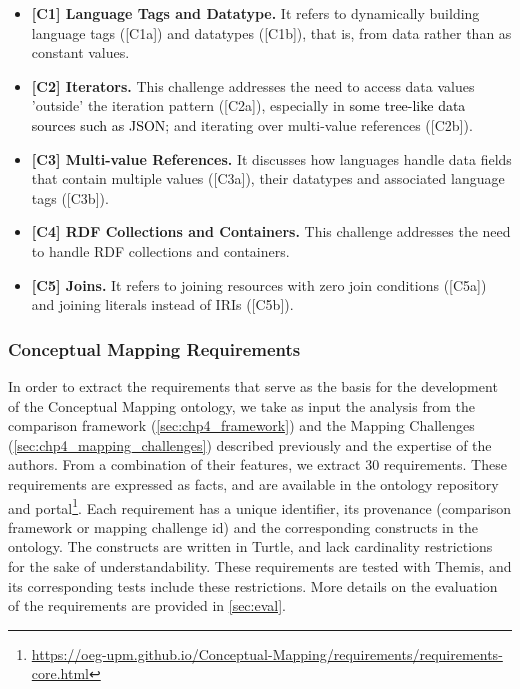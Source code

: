 \begin{itemize}
    \item \textbf{[C1] Language Tags and Datatype.} It refers to dynamically building language tags ([C1a]) and datatypes ([C1b]), that is, from data rather than as constant values.
    \item \textbf{[C2] Iterators.} This challenge addresses the need to access data values 'outside' the iteration pattern ([C2a]), especially in \textcolor{black}{some tree-like data sources such as JSON}; and iterating over multi-value references ([C2b]).
    \item \textbf{[C3] Multi-value References.} It discusses how languages  handle data fields that contain multiple values ([C3a]), their datatypes and associated language tags ([C3b]).
    \item \textbf{[C4] RDF Collections and Containers.} This challenge addresses the need to handle RDF collections and containers.
    \item \textbf{[C5] Joins.} It refers to joining resources with zero join conditions ([C5a]) and joining literals instead of IRIs ([C5b]).
\end{itemize} 


\subsubsection{Conceptual Mapping Requirements}

In order to extract the requirements that serve as the basis for the development of the Conceptual Mapping ontology, we take as input the analysis from the comparison framework (\cref{sec:chp4_framework}) and the Mapping Challenges (\cref{sec:chp4_mapping_challenges}) described previously and the expertise of the authors. From a combination of their features, we extract 30 requirements. These requirements are expressed as facts, and are available in the ontology repository and portal\footnote{\url{https://oeg-upm.github.io/Conceptual-Mapping/requirements/requirements-core.html}}. Each requirement has a unique identifier, its provenance (comparison framework or mapping challenge id) and the corresponding constructs in the ontology. The constructs are written in Turtle, and lack cardinality restrictions for the sake of understandability. These requirements are tested with Themis, and its corresponding tests include these restrictions. More details on the evaluation of the requirements are provided in \cref{sec:eval}. 

